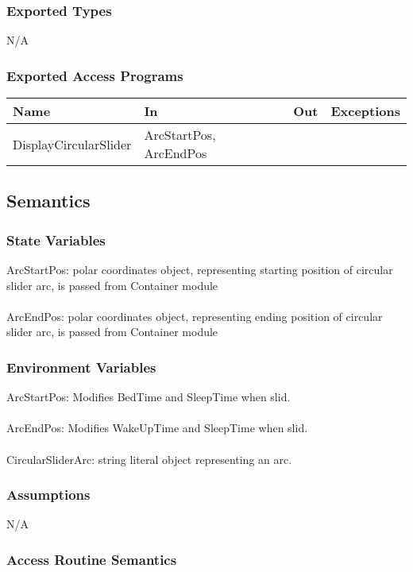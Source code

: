 \documentclass[12pt, titlepage]{article}
\begin{document}
\subsubsection{Exported Types}
N/A

\subsubsection{Exported Access Programs}

\begin{tabular}{| l | l | l | l |}
	\hline
	{\textbf{Name}} & {\textbf{In}} & {\textbf{Out}} & {\textbf{Exceptions}}\\
	\hline
	{DisplayCircularSlider} & ArcStartPos, ArcEndPos & & \\
	\hline
\end{tabular}

\subsection{Semantics}

\subsubsection{State Variables}
ArcStartPos: polar coordinates object, representing starting position of circular slider arc, is passed from Container module\\\\
ArcEndPos: polar coordinates object, representing ending position of circular slider arc, is passed from Container module

\subsubsection{Environment Variables}
ArcStartPos: Modifies BedTime and SleepTime when slid.\\\\
ArcEndPos: Modifies WakeUpTime and SleepTime when slid.\\\\
CircularSliderArc: string literal object representing an arc.

\subsubsection{Assumptions}
N/A

\subsubsection{Access Routine Semantics}
\end{document}
